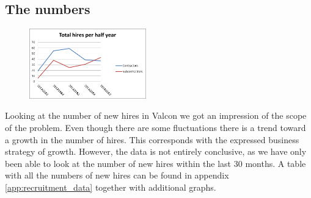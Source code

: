 \subsection{The numbers}
\begin{figure}
\vspace{-20pt}
\centering
\includegraphics[width=0.45\textwidth]{appendix/total_hires_per_half_year.png}
\label{fig:total_hires_per_half_year}
\end{figure}
Looking at the number of new hires in Valcon we got an impression of the scope of the problem.
Even though there are some fluctuations there is a trend toward a growth in the number of hires.
This corresponds with the expressed business strategy of growth.
However, the data is not entirely conclusive, as we have only been able to look at the number of new hires within the last 30 months.
A table with all the numbers of new hires can be found in appendix \ref{app:recruitment_data} together with additional graphs.